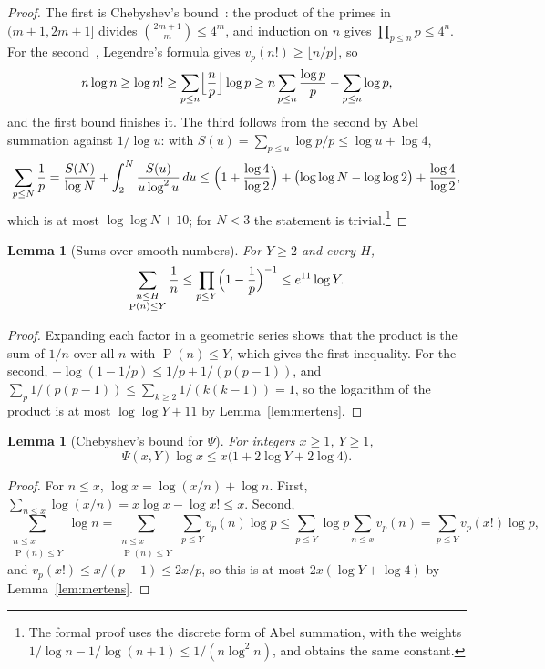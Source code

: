 \documentclass[11pt]{amsart}
\newtheorem{lemma}[theorem]{Lemma}
\theoremstyle{definition}
\theoremstyle{remark}
\numberwithin{equation}{section}
\newcommand{\e}{e}
\DeclareMathOperator{\gpf}{P}
\begin{document}
\begin{proof}
The first is Chebyshev's bound~\cite{chebyshev52}: the product of the primes
in $(m+1,2m+1]$ divides $\binom{2m+1}m\le4^m$, and induction on $n$ gives
$\prod_{p\le n}p\le4^n$. For the second~\cite{mertens74}, Legendre's formula
gives $v_p(n!)\ge\lfloor n/p\rfloor$, so
\[
n\log n\ge\log n!\ge\sum_{p\le n}\Bigl\lfloor\frac np\Bigr\rfloor\log p\ge n\sum_{p\le n}\frac{\log p}p-\sum_{p\le n}\log p,
\]
and the first bound finishes it. The third follows from the second by Abel
summation against $1/\log u$: with $S(u)=\sum_{p\le u}\log p/p\le\log u+\log4$,
\[
\sum_{p\le N}\frac1p=\frac{S(N)}{\log N}+\int_2^N\frac{S(u)}{u\log^2u}\,du\le
\Bigl(1+\frac{\log 4}{\log 2}\Bigr)+\bigl(\log\log N-\log\log2\bigr)+\frac{\log4}{\log2},
\]
which is at most $\log\log N+10$; for $N<3$ the statement is trivial.\footnote{The
formal proof uses the discrete form of Abel summation, with the weights
$1/\log n-1/\log(n+1)\le1/(n\log^2n)$, and obtains the same constant.}
\end{proof}

\begin{lemma}[Sums over smooth numbers]\label{lem:smooth}
For $Y\ge2$ and every $H$,
\[
\sum_{\substack{n\le H\\ \gpf(n)\le Y}}\frac1n\le\prod_{p\le Y}\Bigl(1-\frac1p\Bigr)^{-1}\le\e^{11}\log
Y .
\]
\end{lemma}

\begin{proof}
Expanding each factor in a geometric series shows that the product is the sum
of $1/n$ over all $n$ with $\gpf(n)\le Y$, which gives the first inequality.
For the second, $-\log(1-1/p)\le1/p+1/(p(p-1))$, and
$\sum_p1/(p(p-1))\le\sum_{k\ge2}1/(k(k-1))=1$, so the logarithm of the product is at
most $\log\log Y+11$ by Lemma~\ref{lem:mertens}.
\end{proof}

\begin{lemma}[Chebyshev's bound for $\Psi$]\label{lem:psi}
For integers $x\ge1$, $Y\ge1$,
\[
\Psi(x,Y)\log x\le x\bigl(1+2\log Y+2\log4\bigr).
\]
\end{lemma}

\begin{proof}
For $n\le x$, $\log x=\log(x/n)+\log n$. First,
$\sum_{n\le x}\log(x/n)=x\log x-\log x!\le x$. Second,
\[
\sum_{\substack{n\le x\\ \gpf(n)\le Y}}\log n=\sum_{\substack{n\le x\\ \gpf(n)\le Y}}\ \sum_{p\le Y}v_p(n)\log p\le\sum_{p\le
Y}\log p\sum_{n\le x}v_p(n)=\sum_{p\le Y}v_p(x!)\log p,
\]
and $v_p(x!)\le x/(p-1)\le2x/p$, so this is at most $2x(\log Y+\log 4)$ by
Lemma~\ref{lem:mertens}.
\end{proof}
\end{document}

